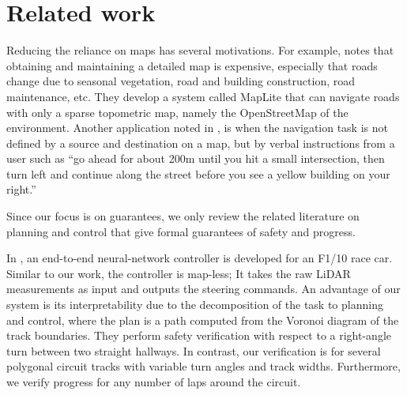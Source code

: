 \section{Related work}
\label{sec:relwork}
Reducing the reliance on maps has several motivations.
%
For example, \cite{Ort.2019} notes that 
obtaining and maintaining a detailed map is expensive, especially that roads change due to seasonal vegetation, road and building construction, road maintenance, etc.
%
They develop a system called MapLite that can navigate roads with only a sparse topometric map, namely the OpenStreetMap of the environment.
%
Another application noted in \cite{Vasudevan.2021}, \cite{Deruyttere.2019} is when the navigation task is not defined by a source and destination on a map, but by verbal instructions from a user such as ``go ahead for about 200m until you hit a small intersection, then turn left and continue along the street before you see a yellow building on your right.''


Since our focus is on guarantees, we only review the related literature on planning and control that give formal guarantees of safety and progress.


In \cite{Ivanov.2020}, an end-to-end neural-network controller is developed for an F1/10 race car.
%
Similar to our work, the controller is map-less;
%
It takes the raw LiDAR measurements as input and outputs the steering commands.
%
An advantage of our system is its interpretability due to the decomposition of the task to planning and control, where the plan is a path computed from the Voronoi diagram of the track boundaries.
%
They perform safety verification with respect to a right-angle turn between two straight hallways.
%
In contrast, our verification is for several polygonal circuit tracks with variable turn angles and track widths.
%
Furthermore, we verify progress for any number of laps around the circuit.


